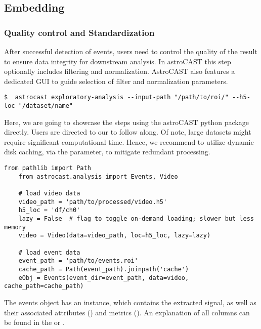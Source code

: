 \subsection{Embedding}\label{subsec:embedding}

\subsubsection{Quality control and Standardization}\label{subsubsec:quality-control}

After successful detection of events, users need to control the quality of the result to ensure data integrity for downstream analysis. In astroCAST this step optionally includes filtering and normalization. AstroCAST also features a dedicated GUI to guide selection of filter and normalization parameters.

\begin{lstlisting}[style=bashStyle]
    $  astrocast exploratory-analysis --input-path "/path/to/roi/" --h5-loc "/dataset/name"
\end{lstlisting}

Here, we are going to showcase the steps using the astroCAST python package directly. Users are directed to our  to follow along. Of note, large datasets might require significant computational time. Hence, we recommend to utilize dynamic disk caching, via the  parameter, to mitigate redundant processing.

\begin{lstlisting}[style=pyStyle]
    from pathlib import Path
    from astrocast.analysis import Events, Video

    # load video data
    video_path = 'path/to/processed/video.h5'
    h5_loc = 'df/ch0'
    lazy = False  # flag to toggle on-demand loading; slower but less memory
    video = Video(data=video_path, loc=h5_loc, lazy=lazy)

    # load event data
    event_path = 'path/to/events.roi'
    cache_path = Path(event_path).joinpath('cache')
    eObj = Events(event_dir=event_path, data=video, cache_path=cache_path)

\end{lstlisting}

The events object has an  instance, which contains the extracted signal, as well as their associated attributes () and metrics (). An explanation of all columns can be found in the  or .

